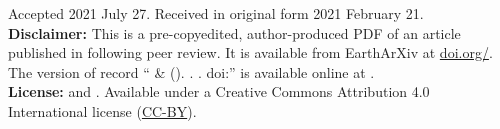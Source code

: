 \documentclass[twocolumn,10pt]{article}
\newcommand{\Author}{%
  \SolerShort{} \& \UiedaShort
}
\newcommand{\AuthorLong}{%
  \Soler{} and \Uieda
}
\newcommand{\AuthorAffil}{%
    {\large
      \Soler$^{1,2}$ \orcidlink{\SolerORCID} and
        \Uieda$^{3}$ \orcidlink{\UiedaORCID}
    }
    \\[0.4cm]
    {\small $^{1}$\CONICET} \\
    {\small $^{2}$\IGSV} \\
    {\small $^{3}$\Liverpool} \\
    {\small\SolerMail} \\
}
\begin{document}
\title{\Title}
\author{\AuthorAffil}
\date{
    \normalsize
    \Year
}
\maketitle

\noindent
Accepted 2021 July 27. Received in original form 2021 February 21.
\\[0.5cm]
\noindent
\textbf{Disclaimer:}
This is a pre-copyedited, author-produced PDF of an article
published in \Journal{} following peer review.
It is available from EarthArXiv at
\href{https://doi.org/\PreprintDOI}{doi.org/\PreprintDOI}.
The version of record
``\Author{} (\Year{}). \Title{}. \Journal{}. doi:\DOI{}''
is available online at \DOILink{}.
\\[0.5cm]
\noindent
\textbf{License:}
\textcopyright{} \Year{} \AuthorLong{}.
Available under a Creative Commons Attribution 4.0 International license
(\href{https://creativecommons.org/licenses/by/4.0/}{CC-BY}).


\begin{abstract}
    
\end{abstract}











\end{document}
